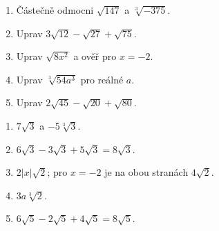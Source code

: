 \documentclass[11pt,a4paper]{article}
\begin{document}

\begin{zadaniReseniBox}[title={Domácí úlohy},breakable=false]
\begin{enumerate}[label=\alph*)]
\item Částečně odmocni $\sqrt{147}$ a $\sqrt[3]{-375}$.
\item Uprav $3\sqrt{12}-\sqrt{27}+\sqrt{75}$.
\item Uprav $\sqrt{8x^2}$ a ověř pro $x=-2$.
\item Uprav $\sqrt[3]{54a^3}$ pro reálné $a$.
\item Uprav $2\sqrt{45}-\sqrt{20}+\sqrt{80}$.
\end{enumerate}
\tcblower
\begin{enumerate}[label=\alph*)]
\item $7\sqrt3$ a $-5\sqrt[3]3$.
\item $6\sqrt3-3\sqrt3+5\sqrt3=8\sqrt3$.
\item $2|x|\sqrt2$; pro $x=-2$ je na obou stranách $4\sqrt2$.
\item $3a\sqrt[3]2$.
\item $6\sqrt5-2\sqrt5+4\sqrt5=8\sqrt5$.
\end{enumerate}
\end{zadaniReseniBox}
\end{document}
